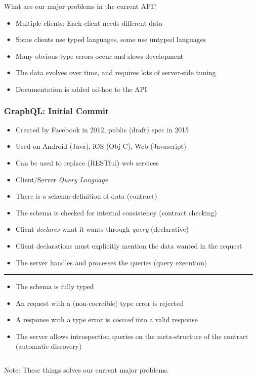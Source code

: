 \documentclass[lualatex]{beamer}
\begin{document}
\begin{frame}
  What are our major problems in the current API?
  \begin{itemize}
  \item Multiple clients: Each client needs different data
  \item Some clients use typed languages, some use untyped languages
  \item Many obvious type errors occur and slows development
  \item The data evolves over time, and requires lots of server-side
    tuning
  \item Documentation is added ad-hoc to the API
  \end{itemize}
\end{frame}

\begin{frame}
  \frametitle{GraphQL: Initial Commit}
  \begin{itemize}
  \item Created by Facebook in 2012, public (draft) spec in 2015
  \item Used on Android (Java), iOS (Obj-C), Web (Javascript)
  \item Can be used to replace (RESTful) web services
  \item Client/Server \emph{Query Language}
  \end{itemize}
\end{frame}

\begin{frame}
  \begin{itemize}
  \item There is a schema-definition of data (contract)
  \item The schema is checked for internal consistency (contract checking)
  \item Client \emph{declares} what it wants through \emph{query}
    (declarative)
  \item Client declarations must explicitly mention the data wanted in
    the request
  \item The server handles and processes the queries (query execution)
  \end{itemize}
  \rule{\textwidth}{1pt}
\end{frame}

\begin{frame}
  \begin{itemize}
  \item The schema is fully typed
  \item An request with a (non-coercible) type error is rejected
  \item A response with a type error is \emph{coerced} into a valid
    response
  \item The server allows introspection queries on the meta-structure
    of the contract (automatic discovery)
  \end{itemize}
  \rule{\textwidth}{1pt}
  Note: These things solves our current major problems.
\end{frame}
\end{document}
